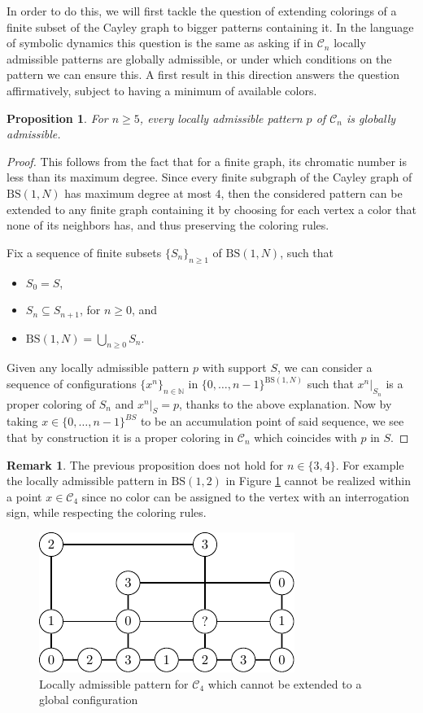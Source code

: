 \documentclass[letterpaper,11pt,reqno]{amsart}
\theoremstyle{plain}
\newtheorem{proposition}[theorem]{Proposition}
\theoremstyle{definition}
\theoremstyle{cupremark}
\newtheorem{remark}[theorem]{Remark}
\newcommand{\BS}[1][N]{\mathrm{BS}(1,#1)}
\begin{document}
In order to do this, we will first tackle the question of extending colorings of a finite subset of the Cayley graph to bigger patterns containing it. In the language of symbolic dynamics this question is the same as asking if in $\mathcal{C}_n$ locally admissible patterns are globally admissible, or under which conditions on the pattern we can ensure this. A first result in this direction answers the question affirmatively, subject to having a minimum of available colors.
\begin{proposition} \label{prop:loc_adm_5_colors}
	For $n\ge 5$, every locally admissible pattern $p$ of $\mathcal{C}_n$ is globally admissible.
\end{proposition}
\begin{proof}
	This follows from the fact that for a finite graph, its chromatic number is less than its maximum degree. Since every finite subgraph of the Cayley graph of $\BS$ has maximum degree at most $4$, then the considered pattern can be extended to any finite graph containing it by choosing for each vertex a color that none of its neighbors has, and thus preserving the coloring rules. 
	
	Fix a sequence of finite subsets $\{S_n\}_{n\ge 1}$ of $\BS$, such that
	\begin{itemize}
		\item $S_0=S$,
		\item $S_n\subseteq S_{n+1}$, for $n\ge 0$, and
		\item $\BS=\bigcup_{n\ge 0}S_n$.
	\end{itemize}
	
	Given any locally admissible pattern $p$ with support $S$, we can consider a sequence of configurations $\{x^{n}\}_{n\in \mathbb{N}}$ in $\{0,\ldots,n-1\}^{\BS}$ such that $x^{n}|_{S_n}$ is a proper coloring of $S_n$ and $x^{n}|_{S}=p$, thanks to the above explanation. Now by taking $x\in \{0,\ldots,n-1\}^{BS}$ to be an accumulation point of said sequence, we see that by construction it is a proper coloring in $\mathcal{C}_n$ which coincides with $p$ in $S$.
\end{proof}
\begin{remark} The previous proposition does not hold for $n\in \{3,4\}$. For example the locally admissible pattern in $\BS[2]$ in Figure \ref{fig:no_extend_gap} cannot be realized within a point $x \in \mathcal{C}_4$ since no color can be assigned to the vertex with an interrogation sign, while respecting the coloring rules.
	\begin{figure}
		\centering
		\includegraphics{non_globallyadmissible.pdf}
		\caption{Locally admissible pattern for $\mathcal{C}_4$ which cannot be extended to a global configuration}
		\label{fig:no_extend_gap}
	\end{figure}	
\end{remark}
\end{document}
